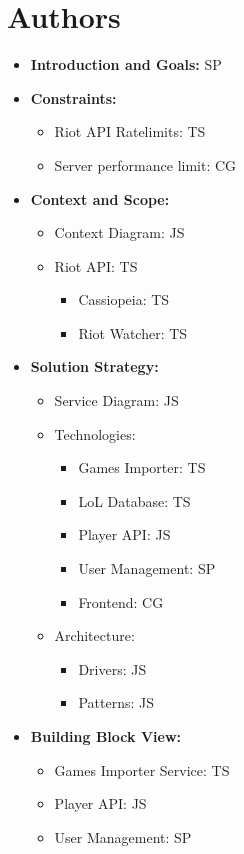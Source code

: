 \section{Authors}
\begin{itemize}
\item
\textbf{Introduction and Goals:} SP
\item
\textbf{Constraints:}
	\begin{itemize}
	\item
	Riot API Ratelimits: TS
	\item
	Server performance limit: CG
	\end{itemize}
\item
\textbf{Context and Scope:}
	\begin{itemize}
	\item
	Context Diagram: JS
	\item
	Riot API: TS
	\begin{itemize}
		\item
		Cassiopeia: TS
		\item
		Riot Watcher: TS
	\end{itemize}
	\end{itemize}
\item
\textbf{Solution Strategy:}
\begin{itemize}
	\item
	Service Diagram: JS
	\item
	Technologies:
	\begin{itemize}
		\item
		Games Importer: TS
		\item
		LoL Database: TS
		\item
		Player API: JS
		\item
		User Management: SP
		\item
		Frontend: CG
	\end{itemize}
	\item
	Architecture:
	\begin{itemize}
		\item
		Drivers: JS
		\item
		Patterns: JS
	\end{itemize}
\end{itemize}
\item
\textbf{Building Block View:}
\begin{itemize}
	\item
	Games Importer Service: TS
	\item
	Player API: JS
	\item
	User Management: SP

\end{itemize}
\end{itemize}
